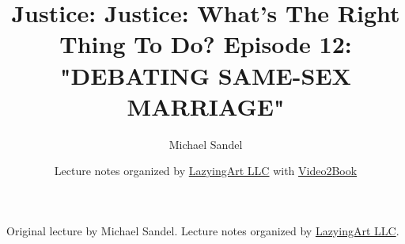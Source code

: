 \documentclass[11pt,oneside]{book}
\begin{document}
\frontmatter
\title{Justice: Justice: What's The Right Thing To Do? Episode 12: "DEBATING SAME-SEX MARRIAGE"}
\author{Michael Sandel}
\date{Lecture notes organized by \href{https://lazying.art}{LazyingArt LLC} with \href{https://github.com/lachlanchen/Video2Book}{Video2Book}}
\maketitle
\begin{center}
\small Original lecture by Michael Sandel. Lecture notes organized by \href{https://lazying.art}{LazyingArt LLC}.
\end{center}
\clearpage
\mainmatter

\end{document}
